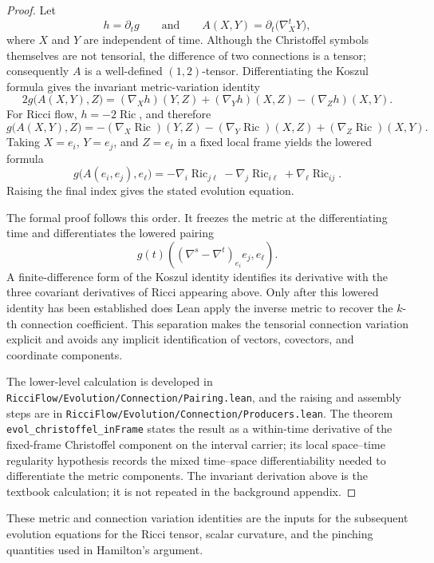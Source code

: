 \documentclass[11pt]{article}
\theoremstyle{plain}
\theoremstyle{definition}
\theoremstyle{remark}
\newcommand{\Ric}{\operatorname{Ric}}
\newcommand{\leanref}[1]{\nolinkurl{#1}}
\newcommand{\leanfile}[1]{\nolinkurl{#1}}
\newcommand{\rffile}[1]{\leanfile{#1}}
\begin{document}
\begin{proof}
Let
\[
  h=\partial_tg
  \qquad\text{and}\qquad
  A(X,Y)=\partial_t\bigl(\nabla^t_XY\bigr),
\]
where \(X\) and \(Y\) are independent of time.  Although the Christoffel symbols
themselves are not tensorial, the difference of two connections is a tensor;
consequently \(A\) is a well-defined \((1,2)\)-tensor.  Differentiating the
Koszul formula gives the invariant metric-variation identity
\[
  2g\bigl(A(X,Y),Z\bigr)
  =
  (\nabla_Xh)(Y,Z)
  +
  (\nabla_Yh)(X,Z)
  -
  (\nabla_Zh)(X,Y).
\]
For Ricci flow, \(h=-2\Ric\), and therefore
\[
  g\bigl(A(X,Y),Z\bigr)
  =
  -(\nabla_X\Ric)(Y,Z)
  -(\nabla_Y\Ric)(X,Z)
  +(\nabla_Z\Ric)(X,Y).
\]
Taking \(X=e_i\), \(Y=e_j\), and \(Z=e_\ell\) in a fixed local frame yields the
lowered formula
\[
  g\bigl(A(e_i,e_j),e_\ell\bigr)
  =
  -\nabla_i\Ric_{j\ell}
  -\nabla_j\Ric_{i\ell}
  +\nabla_\ell\Ric_{ij}.
\]
Raising the final index gives the stated evolution equation.

The formal proof follows this order.  It freezes the metric at the
differentiating time and differentiates the lowered pairing
\[
  g(t)\!\left(
    (\nabla^s-\nabla^t)_{e_i}e_j,e_\ell
  \right).
\]
A finite-difference form of the Koszul identity identifies its derivative with
the three covariant derivatives of Ricci appearing above.  Only after this
lowered identity has been established does Lean apply the inverse metric to
recover the \(k\)-th connection coefficient.  This separation makes the
tensorial connection variation explicit and avoids any implicit identification
of vectors, covectors, and coordinate components.

The lower-level calculation is developed in
\rffile{RicciFlow/Evolution/Connection/Pairing.lean}, and the raising and
assembly steps are in \rffile{RicciFlow/Evolution/Connection/Producers.lean}.
The theorem \leanref{evol_christoffel_inFrame} states the result as a
within-time derivative of the fixed-frame Christoffel component on the interval
carrier; its local space--time regularity hypothesis records the mixed
time--space differentiability needed to differentiate the metric components.
The invariant derivation above is the textbook calculation; it is not repeated
in the background appendix.
\end{proof}

These metric and connection variation identities are the inputs for the
subsequent evolution equations for the Ricci tensor, scalar curvature, and the
pinching quantities used in Hamilton's argument.
\end{document}

